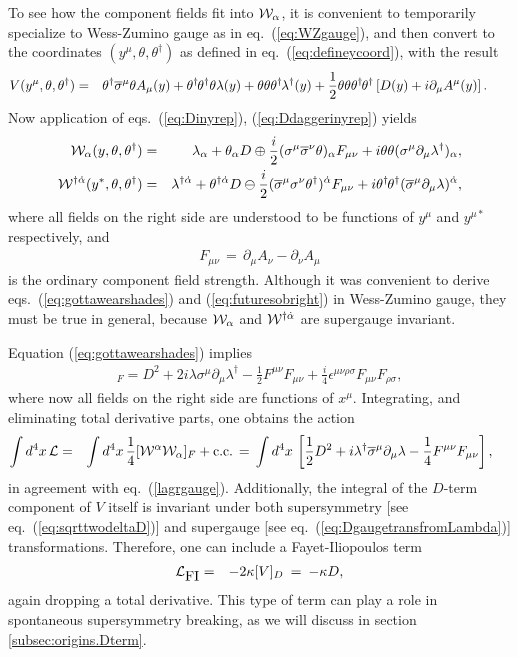 \documentclass[11pt]{article}
\def\BDplus{+}
\def\BDminus{-}
\def\thetasigmamuthetadagger{\theta\sigma^\mu\theta^\dagger}
\def\BDplus{-}
\def\BDminus{+}
\def\thetasigmamuthetadagger{\theta^\dagger\sigmabar^\mu\theta}
\def\BDplus{\oplus}
\def\BDminus{\ominus}
\def\thetasigmamuthetadagger{\theta\sigma^\mu\theta^\dagger}
\def\BDplus{\ominus}
\def\BDminus{\oplus}
\def\thetasigmamuthetadagger{\theta^\dagger\sigmabar^\mu\theta}
\newcommand{\thdthd}{\theta^\dagger\hspace{-1pt}\theta^\dagger}
\def\beq{\begin{eqnarray}}
\def\eeq{\end{eqnarray}}
\def\sigmabar{\overline\sigma}
\begin{document}
To see how the component fields fit into ${\cal W}_\alpha$, it is convenient
to temporarily specialize to Wess-Zumino gauge as in eq.~(\ref{eq:WZgauge}), and
then convert to the coordinates $(y^\mu, \theta, \theta^\dagger)$ 
as defined in eq.~(\ref{eq:defineycoord}), with the result 
\beq
V(y^\mu, \theta,\theta^\dagger) &=&
\thetasigmamuthetadagger  A_\mu(y) 
+ \thdthd \theta \lambda(y) 
+ \theta \theta  \theta^\dagger\hspace{-1pt} \lambda^\dagger(y)  
+ \frac{1}{2} \theta\theta\thdthd 
\left [D(y)
+ i \partial_\mu A^\mu(y) \right ].\phantom{xxx}
\eeq
Now application of eqs.~(\ref{eq:Dinyrep}), (\ref{eq:Ddaggerinyrep}) 
yields
\beq
{\cal W}_\alpha(y,\theta,\theta^\dagger)
&=& 
\lambda_\alpha + \theta_\alpha D 
\BDminus \frac{i}{2} (\sigma^\mu\sigmabar^\nu\theta)_\alpha F_{\mu\nu}
+ i \theta\theta (\sigma^\mu\partial_\mu \lambda^\dagger)_\alpha ,
\label{eq:gottawearshades}
\\
{\cal W}^{\dagger\dot\alpha}(y^*,\theta,\theta^\dagger)
&=& 
\lambda^{\dagger\dot \alpha} + \theta^{\dagger\dot\alpha} D 
\BDplus \frac{i}{2} (\sigmabar^\mu\sigma^\nu \theta^\dagger)^{\dot\alpha} 
F_{\mu\nu}
+ i \thdthd (\sigmabar^\mu\partial_\mu \lambda  )^{\dot\alpha},
\label{eq:futuresobright}
\eeq
where 
all fields on the right side are understood to be functions of 
$y^\mu$ and $y^{\mu *}$ respectively, and
\beq
F_{\mu\nu} \,=\, \partial_\mu A_\nu - \partial_\nu A_\mu
\eeq
is the ordinary component field strength.
Although it was convenient to derive eqs.~(\ref{eq:gottawearshades}) and 
(\ref{eq:futuresobright}) in Wess-Zumino gauge, they must 
be true in general, because ${\cal W}_\alpha$ and ${\cal W}^{\dagger\dot\alpha}$ 
are supergauge invariant.

Equation (\ref{eq:gottawearshades}) implies
\beq
[{\cal W}^\alpha {\cal W}_\alpha]_F = D^2 +
2 i \lambda \sigma^\mu \partial_\mu \lambda^\dagger
-\frac{1}{2} F^{\mu\nu} F_{\mu\nu} 
+ \frac{i}{4} \epsilon^{\mu\nu\rho\sigma} F_{\mu\nu} F_{\rho\sigma} 
,
\label{eq:Bushwickblues}
\eeq
where now all fields on the right side are functions of $x^\mu$.
Integrating, and eliminating total derivative parts, one obtains
the action
\beq
\int d^4 x\, {\cal L} 
&=& 
\int d^4 x\, \frac{1}{4} [{\cal W}^\alpha {\cal W}_\alpha]_F + {\rm c.c.}
\,=\,
\int d^4 x\, 
\left [ 
\frac{1}{2} D^2  + 
i \lambda^\dagger \sigmabar^\mu \partial_\mu \lambda 
- \frac{1}{4} F^{\mu\nu} F_{\mu\nu} 
\right ],
\phantom{xx}
\eeq
in agreement with eq.~(\ref{lagrgauge}). 
Additionally,
the integral of the $D$-term component of $V$ itself is invariant  under 
both supersymmetry [see eq.~(\ref{eq:sqrttwodeltaD})] and supergauge [see 
eq.~(\ref{eq:DgaugetransfromLambda})]
transformations. Therefore, one can include a Fayet-Iliopoulos term
\beq
{\cal L}_{\mbox{FI}} &=& -2 \kappa [V]_D \>=\>-\kappa D,
\eeq
again dropping a total derivative. This type of term can play a role in spontaneous
supersymmetry breaking, as we will discuss in section \ref{subsec:origins.Dterm}.
\end{document}
